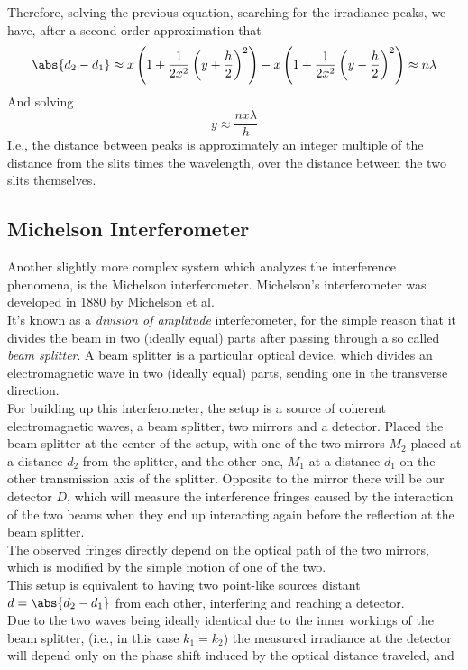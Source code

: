 \documentclass[../electromagnetism.tex]{subfiles}
\begin{document}
Therefore, solving the previous equation, searching for the irradiance peaks, we have, after a second order approximation that
\begin{equation*}
	\abs{d_2-d_1}\approx x\left( 1+\frac{1}{2x^2}\left( y+\frac{h}{2} \right)^2 \right)-x\left( 1+\frac{1}{2x^2}\left( y-\frac{h}{2} \right)^2 \right)\approx n\lambda
\end{equation*}
And solving 
\begin{equation}
	y\approx\frac{nx\lambda}{h}
	\label{eq:peakdistanceapprox}
\end{equation}
I.e., the distance between peaks is approximately an integer multiple of the distance from the slits times the wavelength, over the distance between the two slits themselves.
\subsection{Michelson Interferometer}
Another slightly more complex system which analyzes the interference phenomena, is the Michelson interferometer. Michelson's interferometer was developed in 1880 by Michelson et al.\\
It's known as a \emph{division of amplitude} interferometer, for the simple reason that it divides the beam in two (ideally equal) parts after passing through a so called \emph{beam splitter}. A beam splitter is a particular optical device, which divides an electromagnetic wave in two (ideally equal) parts, sending one in the transverse direction.\\
For building up this interferometer, the setup is a source of coherent electromagnetic waves, a beam splitter, two mirrors and a detector. Placed the beam splitter at the center of the setup, with one of the two mirrors $M_2$ placed at a distance $d_2$ from the splitter, and the other one, $M_1$ at a distance $d_1$ on the other transmission axis of the splitter. Opposite to the mirror there will be our detector $D$, which will measure the interference fringes caused by the interaction of the two beams when they end up interacting again before the reflection at the beam splitter.\\
The observed fringes directly depend on the optical path of the two mirrors, which is modified by the simple motion of one of the two.\\
This setup is equivalent to having two point-like sources distant $d=\abs{d_2-d_1}$ from each other, interfering and reaching a detector.\\
Due to the two waves being ideally identical due to the inner workings of the beam splitter, (i.e., in this case $k_1=k_2$) the measured irradiance at the detector will depend only on the phase shift induced by the optical distance traveled, and 
\end{document}
